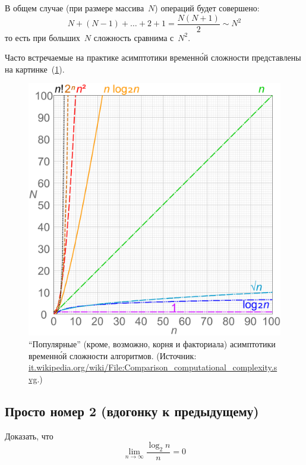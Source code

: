 \documentclass[a4paper,12pt]{article}
\begin{document}
\begin{remark}
    В общем случае (при размере массива~$N$) операций будет совершено:
    \[
      N + (N - 1) + \ldots + 2 + 1 = \frac{N(N + 1)}{2} \sim N^2
    \]
    то есть при больших~$N$ сложность сравнима с~$N^2$.
    
    Часто встречаемые на практике асимптотики временн\'{о}й сложности представлены на картинке~(\ref{fig:complexities}).
    
    \begin{figure}[ht]
      \centering
      \includegraphics[width=0.8\linewidth]{images/Comparison_computational_complexity}
      
      \caption{
        ``Популярные'' (кроме, возможно, корня и факториала) асимптотики временн\'{о}й сложности алгоритмов.
        ({\small Источник: \href{https://it.wikipedia.org/wiki/File:Comparison\_computational\_complexity.svg}{it.wikipedia.org/wiki/File:Comparison\_computational\_complexity.svg}.})
      }
      \label{fig:complexities}
    \end{figure}
  \end{remark}
  
  \subsection{Просто номер 2 (вдогонку к предыдущему)}
  
  Доказать, что
  \[
    \lim_{n \to \infty} \frac{\log_2 n}{n} = 0
  \]
  
\end{document}
